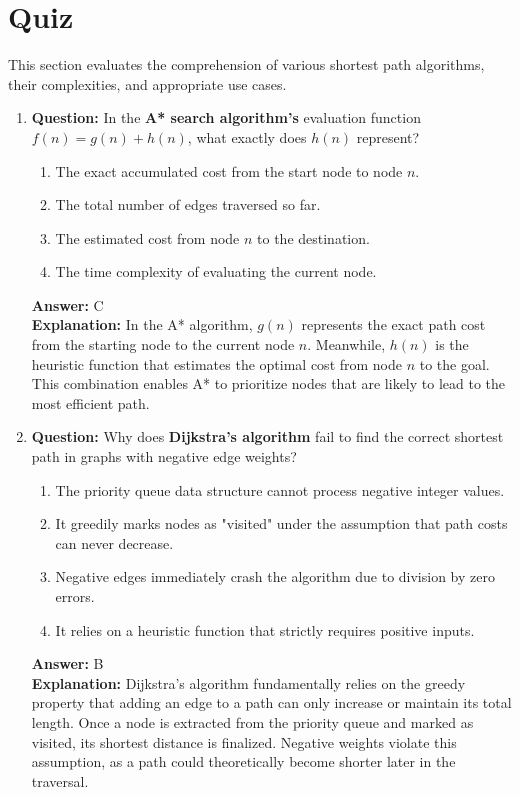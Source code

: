 \section{Quiz}

\label{sec:quiz}

This section evaluates the comprehension of various shortest path algorithms, their complexities, and appropriate use cases.

\begin{enumerate}[label=\arabic*., itemsep=1.5em]

    \item \textbf{Question:} In the \textbf{A* search algorithm's} evaluation function $f(n) = g(n) + h(n)$, what exactly does $h(n)$ represent?
    \begin{enumerate}[label=\Alph*.]
        \item The exact accumulated cost from the start node to node $n$.
        \item The total number of edges traversed so far.
        \item The estimated cost from node $n$ to the destination.
        \item The time complexity of evaluating the current node.
    \end{enumerate}
    \textbf{Answer:} C \\
    \textbf{Explanation:} In the A* algorithm, $g(n)$ represents the exact path cost from the starting node to the current node $n$. Meanwhile, $h(n)$ is the heuristic function that estimates the optimal cost from node $n$ to the goal. This combination enables A* to prioritize nodes that are likely to lead to the most efficient path.

    \item \textbf{Question:} Why does \textbf{Dijkstra's algorithm} fail to find the correct shortest path in graphs with negative edge weights?
    \begin{enumerate}[label=\Alph*.]
        \item The priority queue data structure cannot process negative integer values.
        \item It greedily marks nodes as "visited" under the assumption that path costs can never decrease.
        \item Negative edges immediately crash the algorithm due to division by zero errors.
        \item It relies on a heuristic function that strictly requires positive inputs.
    \end{enumerate}
    \textbf{Answer:} B \\
    \textbf{Explanation:} Dijkstra's algorithm fundamentally relies on the greedy property that adding an edge to a path can only increase or maintain its total length. Once a node is extracted from the priority queue and marked as visited, its shortest distance is finalized. Negative weights violate this assumption, as a path could theoretically become shorter later in the traversal.


\end{enumerate}
